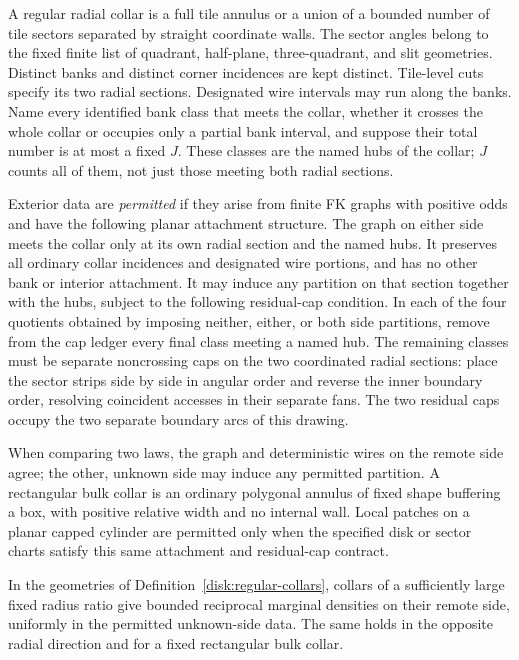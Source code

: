 \begin{definition}
\label{disk:regular-collars}
A regular radial collar is a full tile annulus or a union of a bounded
number of tile sectors separated by straight coordinate walls. The
sector angles belong to the fixed finite list of quadrant, half-plane,
three-quadrant, and slit geometries. Distinct banks and distinct corner
incidences are kept distinct. Tile-level cuts specify its two radial
sections. Designated wire intervals may run along the banks. Name every
identified bank class that meets the collar, whether it crosses the
whole collar or occupies only a partial bank interval, and suppose
their total number is at most a fixed $J$. These classes are the named
hubs of the collar; $J$ counts all of them, not just those meeting
both radial sections.

Exterior data are \emph{permitted} if they arise from finite FK graphs
with positive odds and have the following planar attachment structure.
The graph on either side meets the collar only at its own radial
section and the named hubs. It preserves all ordinary collar incidences
and designated wire portions, and has no other bank or interior
attachment. It may induce any partition on that section together with
the hubs, subject to the following residual-cap condition. In each of
the four quotients obtained by imposing neither, either, or both side
partitions, remove from the cap ledger every final class meeting a
named hub. The remaining classes must be separate noncrossing caps on
the two coordinated radial sections: place the sector strips side by
side in angular order and reverse the inner boundary order, resolving
coincident accesses in their separate fans. The two residual caps
occupy the two separate boundary arcs of this drawing.

When comparing two laws, the graph and deterministic wires on the
remote side agree; the other, unknown side may induce any permitted
partition. A rectangular bulk collar is an ordinary polygonal annulus
of fixed shape buffering a box, with positive relative width and no
internal wall. Local patches on a planar capped cylinder are permitted
only when the specified disk or sector charts satisfy this same
attachment and residual-cap contract.
\end{definition}

\begin{lemma}
\label{disk:initial-collars}
In the geometries of Definition~\ref{disk:regular-collars}, collars of a
sufficiently large fixed radius ratio give bounded reciprocal marginal
densities on their remote side, uniformly in the permitted unknown-side
data. The same holds in the opposite radial direction and for a fixed
rectangular bulk collar.
\end{lemma}

